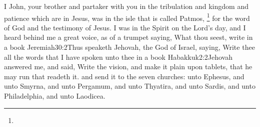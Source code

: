 I John, your brother and partaker with you in the tribulation and kingdom and patience which are in Jesus, was in the isle that is called Patmos,%
	\footnote{ %
			} %
for the word of God and the testimony of Jesus. %
I was in the Spirit on the Lord’s day, and I heard behind me a great voice, as of a trumpet %
saying, What thou seest, write in a book%
%
				{Jeremiah}{30:2}{Thus speaketh Jehovah, the God of Israel, saying, Write thee all the words that I have spoken unto thee in a book}%
				{Habakkuk}{2:2}{Jehovah answered me, and said, Write the vision, and make it plain upon tablets, that he may run that readeth it.} %
and send it to the seven churches: unto Ephesus, and unto Smyrna, and unto Pergamum, and unto Thyatira, and unto Sardis, and unto Philadelphia, and unto Laodicea.

